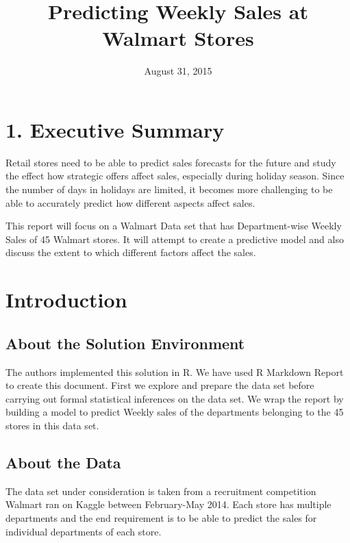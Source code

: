 \documentclass[]{article}
\title{Predicting Weekly Sales at Walmart Stores}
\author{}
\date{August 31, 2015}
\begin{document}
\maketitle


{
\hypersetup{linkcolor=black}
\setcounter{tocdepth}{3}
\tableofcontents
}
\pagebreak

\section{1. Executive Summary}\label{executive-summary}

Retail stores need to be able to predict sales forecasts for the future
and study the effect how strategic offers affect sales, especially
during holiday season. Since the number of days in holidays are limited,
it becomes more challenging to be able to accurately predict how
different aspects affect sales.

This report will focus on a Walmart Data set that has Department-wise
Weekly Sales of 45 Walmart stores. It will attempt to create a
predictive model and also discuss the extent to which different factors
affect the sales.

\pagebreak

\section{Introduction}\label{introduction}

\subsection{About the Solution
Environment}\label{about-the-solution-environment}

The authors implemented this solution in R. We have used R Markdown
Report to create this document. First we explore and prepare the data
set before carrying out formal statistical inferences on the data set.
We wrap the report by building a model to predict Weekly sales of the
departments belonging to the 45 stores in this data set.

\subsection{About the Data}\label{about-the-data}

The data set under consideration is taken from a recruitment competition
Walmart ran on Kaggle between February-May 2014. Each store has multiple
departments and the end requirement is to be able to predict the sales
for individual departments of each store.
\end{document}
